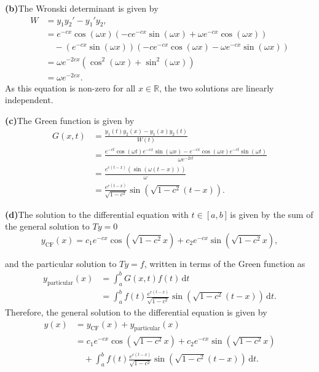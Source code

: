 \documentclass[12pt]{article}
\begin{document}
\smallskip

\noindent\textbf{(b)}\quad The Wronski determinant is given by
\begin{equation}
\begin{aligned}
  W &= y_1y_2' - y_1'y_2,\\
    &= e^{-cx} \cos(\omega x) \left(-c e^{-cx} \sin(\omega x) + \omega e^{-cx} \cos(\omega x)\right)\\
    &\quad - \left(e^{-cx} \sin(\omega x)\right) \left(-c e^{-cx} \cos(\omega x) - \omega e^{-cx} \sin(\omega x)\right)\\
    & =\omega e^{-2cx} \left(\cos^2(\omega x) + \sin^2(\omega x)\right)\\
    &= \omega e^{-2cx}.
\end{aligned}
\end{equation}
As this equation is non-zero for all $x \in \mathbb{R}$, the two solutions are linearly independent.

\smallskip

\noindent\textbf{(c)}\quad The Green function is given by
\begin{equation}
\begin{aligned}
    G(x,t) &= \frac{y_1(t)y_2(x)-y_1(x)y_2(t)}{W(t)}\\
    &= \frac{e^{-ct} \cos(\omega t) e^{-cx} \sin(\omega x) - e^{-cx} \cos(\omega x) e^{-ct} \sin(\omega t)}{\omega e^{-2ct}}\\
    & = \frac{e^{c(t-x)} \left(\sin(\omega \left(t-x\right))\right)}{\omega}\\
    & = \frac{e^{c(t-x)}}{\sqrt{1-c^2}}  \sin(\sqrt{1-c^2} (t-x)).
\end{aligned}
\end{equation}

\pagebreak
\noindent\textbf{(d)}\quad The solution to the differential equation with $t \in [a,b] $\,is given by the sum of the general solution to $Ty=0$ 
\begin{equation}
    y_{\text{CF}}(x) = c_1 e^{-cx} \cos(\sqrt{1-c^2} x) + c_2 e^{-cx} \sin(\sqrt{1-c^2} x),
\end{equation}

and the particular solution to $Ty=f$, written in terms of the Green function as
\begin{equation}
\begin{aligned}
    y_{\text{particular}}(x) &= \int_{a}^{b} G(x,t)f(t)\,\mathrm{d}t\\
    & = \int_{a}^{b} f(t) \frac{e^{c(t-x)}}{\sqrt{1-c^2}}  \sin(\sqrt{1-c^2} (t-x))\,\mathrm{d}t.
\end{aligned}
\end{equation}
Therefore, the general solution to the differential equation is given by
\begin{equation}
\begin{aligned}
    y(x) &= y_{\text{CF}}(x) + y_{\text{particular}}(x) \\
    &= c_1 e^{-cx} \cos(\sqrt{1-c^2} x) + c_2 e^{-cx} \sin(\sqrt{1-c^2} x) \\
    &\quad+ \int_{a}^{b} f(t) \frac{e^{c(t-x)}}{\sqrt{1-c^2}}  \sin(\sqrt{1-c^2} (t-x))\,\mathrm{d}t.
\end{aligned}
\end{equation}
\end{document}
